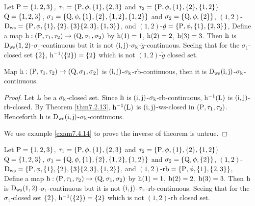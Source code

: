 \begin{exm}\label{exam7.4.12}
Let $\mathrm{P}=\{1,2,3\}$, $\tau_1 =\{\mathrm{P}, \phi, \{1\},\{2,3\}$ and $\tau_2 =\{\TSP, \phi, \{1\},\{2\},\break \{1,2\}\}$ $\mathrm{Q}=\{1,2,3\}$, $\sigma_{1} =\{\mathrm{Q},\phi,\{1\},\{2\},\{1,2\},\{1,2\}\}$ and $\sigma_{2} =\{\mathrm{Q},\phi, \{2\}\}$, $(1,2)$-$\mathrm{D}_{\mathrm{ws}} =\{\mathrm{P}, \phi, \{1\},\{2\},\{3\}\{2,3\},\{1,3\}\}$, and $(1,2)$-$\ddot{g} =\{\mathrm{P}, \phi, \{1\},\{2,3\}\}$, Define a map $\mathrm{h}: (\mathrm{P}, \tau_1, \tau_2 )\to (\mathrm{Q}, \sigma_{1}, \sigma_{2} )$ by $\mathrm{h}(1)=1$, $\mathrm{h}(2)=2$, $\mathrm{h}(3)=3$. Then $\mathrm{h}$ is $\mathrm{D}_{\mathrm{ws}} (1, 2)$-$\sigma_{1}$-continuous but it is not $(\mathrm{i}, \mathrm{j})$-$\sigma_{\mathrm{k}}$-$\ddot{g}$-continuous. Seeing that for the $\sigma_{1}$-closed set $\{2\}$, $\mathrm{h}^{-1} (\{2\})=\{2\}$ which is not $(1, 2)$-$\ddot{g}$ closed set.
\end{exm}

\begin{thm}\label{thm7.4.13}
Map $\mathrm{h}:(\mathrm{P}, \tau_1, \tau_2 )\to (\mathrm{Q}, \sigma_{1}, \sigma_{2} )$ is $(\mathrm{i}, \mathrm{j})$-$\sigma_{\mathrm{k}}$-rb-continuous, then it is $\mathrm{D}_{\mathrm{ws}} (\mathrm{i}, \mathrm{j})$-$\sigma_{\mathrm{k}}$-continuous.
\end{thm}

\begin{proof}
Let $\mathrm{L}$ be a $\sigma_{\mathrm{k}}$-closed set. Since $\mathrm{h}$ is $(\mathrm{i}, \mathrm{j})$-$\sigma_{\mathrm{k}}$-rb-continuous, $\mathrm{h}^{-1} (\mathrm{L})$ is $(\mathrm{i}, \mathrm{j})$-rb-closed. By Theorem \ref{thm7.2.13}, $\mathrm{h}^{-1} (\mathrm{L})$ is $(\mathrm{i}, \mathrm{j})$-ws-closed in $(\mathrm{P}, \tau_1, \tau_2 )$. Henceforth $\mathrm{h}$ is $\mathrm{D}_{\mathrm{ws}} (\mathrm{i}, \mathrm{j})$-$\sigma_{\mathrm{k}}$-continuous.

We use example \ref{exam7.4.14} to prove the inverse of theorem is untrue.
\end{proof}

\begin{exm}\label{exam7.4.14}
Let $\mathrm{P}=\{1,2,3\}$, $\tau_1 =\{\mathrm{P}, \phi, \{1\},\{2,3\}$ and $\tau_2 =\{\TSP, \phi, \{1\},\{2\},\break \{1,2\}\}$ $\mathrm{Q}=\{1,2,3\}$, $\sigma_{1} =\{\mathrm{Q}, \phi,\{1\},\{2\},\{1,2\},\{1,2\}\}$ and $\sigma_{2} =\{\mathrm{Q},\phi,\{2\}\}$, $(1,2)$-$\mathrm{D}_{\mathrm{ws}} =\{\mathrm{P}, \phi, \{1\},\{2\},\{3\}\{2,3\},\{1,2\}\}$, and $(1,2)$-$\mathrm{rb}=\{\mathrm{P}, \phi, \{1\},\{2,3\}\}$, Define a map $\mathrm{h}: (\mathrm{P}, \tau_1, \tau_2 )\to (\mathrm{Q}, \sigma_{1}, \sigma_{2} )$ by $\mathrm{h}(1)=1$, $\mathrm{h}(2)=2$, $\mathrm{h}(3)=3$. Then $\mathrm{h}$ is $\mathrm{D}_{\mathrm{ws}} (1, 2)$-$\sigma_{1}$-continuous but it is not $(\mathrm{i}, \mathrm{j})$-$\sigma_{\mathrm{k}}$-rb-continuous. Seeing that for the $\sigma_{1}$-closed set $\{2\}$, $\mathrm{h}^{-1} (\{2\})=\{2\}$ which is not $(1, 2)$-rb closed set.
\end{exm}

